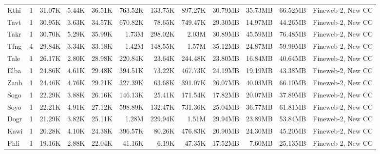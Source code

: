 \begin{table*}[!htp]
{\begin{tabular}{l|c|rrr|rrr|rrr|l}
Kthi                    & 1                        & 31.07K   & 5.44K    & 36.51K  & 763.52K & 133.75K & 897.27K & 30.79MB  & 35.73MB  & 66.52MB  & Fineweb-2, New CC              \\
Tavt                    & 1                        & 30.95K   & 3.63K    & 34.57K  & 670.82K & 78.65K  & 749.47K & 29.30MB  & 14.97MB  & 44.26MB  & Fineweb-2, New CC              \\
Takr                    & 1                        & 30.70K   & 5.29K    & 35.99K  & 1.73M   & 298.02K & 2.03M   & 30.89MB  & 45.59MB  & 76.48MB  & Fineweb-2, New CC              \\
Tfng                    & 4                        & 29.84K   & 3.34K    & 33.18K  & 1.42M   & 148.55K & 1.57M   & 35.12MB  & 24.87MB  & 59.99MB  & Fineweb-2, New CC              \\
Tale                    & 1                        & 26.17K   & 2.80K    & 28.98K  & 220.84K & 23.64K  & 244.48K & 23.80MB  & 16.84MB  & 40.64MB  & Fineweb-2, New CC              \\
Elba                    & 1                        & 24.86K   & 4.61K    & 29.48K  & 394.51K & 73.22K  & 467.73K & 24.19MB  & 19.19MB  & 43.38MB  & Fineweb-2, New CC              \\
Zanb                    & 1                        & 24.46K   & 4.76K    & 29.21K  & 327.39K & 63.68K  & 391.07K & 26.07MB  & 40.03MB  & 66.10MB  & Fineweb-2, New CC              \\
Sogo                    & 1                        & 22.29K   & 3.88K    & 26.16K  & 146.13K & 25.41K  & 171.54K & 17.82MB  & 20.07MB  & 37.89MB  & Fineweb-2, New CC              \\
Soyo                    & 1                        & 22.21K   & 4.91K    & 27.12K  & 598.89K & 132.47K & 731.36K & 25.04MB  & 36.77MB  & 61.81MB  & Fineweb-2, New CC              \\
Dogr                    & 1                        & 21.29K   & 3.82K    & 25.11K  & 1.28M   & 229.94K & 1.51M   & 29.94MB  & 23.89MB  & 53.84MB  & Fineweb-2, New CC              \\
Kawi                    & 1                        & 20.28K   & 4.10K    & 24.38K  & 396.57K & 80.26K  & 476.83K & 20.90MB  & 24.30MB  & 45.20MB  & Fineweb-2, New CC              \\
Phli                    & 1                        & 19.16K   & 2.88K    & 22.04K  & 41.16K  & 6.19K   & 47.35K  & 17.52MB  & 7.60MB   & 25.13MB  & Fineweb-2, New CC              \\

\end{tabular}}
\end{table*}
